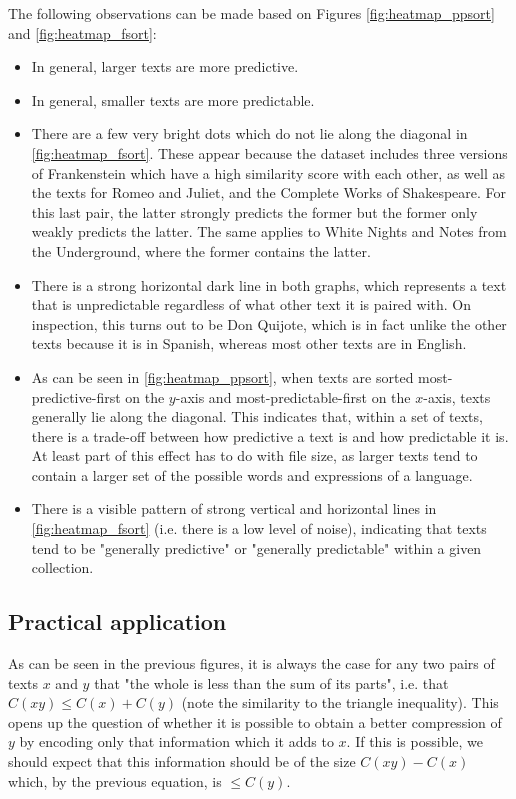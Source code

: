 The following observations can be made based on Figures \ref{fig:heatmap_ppsort} and \ref{fig:heatmap_fsort}:
\begin{itemize}
  \item In general, larger texts are more predictive.
  \item In general, smaller texts are more predictable.
  \item There are a few very bright dots which do not lie along the diagonal in \ref{fig:heatmap_fsort}. These appear because the dataset includes three versions of Frankenstein which have a high similarity score with each other, as well as the texts for Romeo and Juliet, and the Complete Works of Shakespeare. For this last pair, the latter strongly predicts the former but the former only weakly predicts the latter. The same applies to White Nights and Notes from the Underground, where the former contains the latter.
  \item There is a strong horizontal dark line in both graphs, which represents a text that is unpredictable regardless of what other text it is paired with. On inspection, this turns out to be Don Quijote, which is in fact unlike the other texts because it is in Spanish, whereas most other texts are in English.
  \item As can be seen in \ref{fig:heatmap_ppsort}, when texts are sorted most-predictive-first on the $y$-axis and most-predictable-first on the $x$-axis, texts generally lie along the diagonal. This indicates that, within a set of texts, there is a trade-off between how predictive a text is and how predictable it is. At least part of this effect has to do with file size, as larger texts tend to contain a larger set of the possible words and expressions of a language.
  \item There is a visible pattern of strong vertical and horizontal lines in \ref{fig:heatmap_fsort} (i.e. there is a low level of noise), indicating that texts tend to be "generally predictive" or "generally predictable" within a given collection.
\end{itemize}

\subsection{Practical application}
\label{subsec:co_comp_practical}

As can be seen in the previous figures, it is always the case for any two pairs of texts $x$ and $y$ that "the whole is less than the sum of its parts", i.e. that $C(xy) \leq C(x) + C(y)$ (note the similarity to the triangle inequality). This opens up the question of whether it is possible to obtain a better compression of $y$ by encoding only that information which it adds to $x$. If this is possible, we should expect that this information should be of the size $C(xy) - C(x)$ which, by the previous equation, is $\leq C(y)$.

